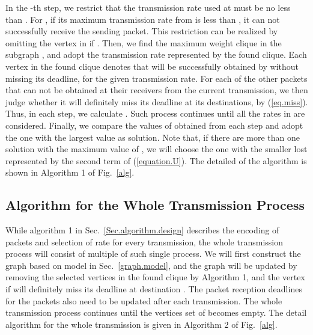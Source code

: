 \documentclass[journal]{IEEEtran}
\begin{document}
In the -th step, we restrict that the transmission rate used at  must be no less than . For , if its maximum transmission rate from  is less than , it can not successfully receive the sending packet. This restriction can be realized by omitting the vertex  in  if . Then, we find the maximum weight clique in the subgraph , and adopt the transmission rate represented by the found clique. Each vertex  in the found clique denotes that  will be successfully obtained by  without missing its deadline, for the given transmission rate. For each of the other packets that can not be obtained at their receivers from the current transmission, we then judge whether it will definitely miss its deadline at its destinations, by (\ref{eq.miss}). Thus, in each step, we calculate . Such process continues until all the rates in  are considered. Finally, we compare the values of  obtained from each step and adopt the one with the largest value as solution.
Note that, if there are more than one solution with the maximum value of , we will choose the one with the smaller lost represented by the second term of (\ref{equation.U}).
The detailed of the algorithm is shown in Algorithm 1 of Fig.~\ref{alg}.
\vspace{-0.1in}
\subsection{Algorithm for the Whole Transmission Process}\vspace{-0.02in}
While algorithm 1 in Sec.~\ref{Sec.algorithm.design} describes the encoding of packets and selection of rate for every transmission, the whole transmission process will consist of multiple of such single process. We will first construct the graph  based on model in Sec.~\ref{graph.model}, and the graph will be updated by removing the selected vertices in the found clique by Algorithm 1, and the vertex  if  will definitely miss its deadline at destination . The packet reception deadlines for the packets also need to be updated after each transmission. The whole transmission process continues until the vertices set  of  becomes empty. The detail algorithm for the whole transmission is given in Algorithm 2 of Fig.~\ref{alg}.
\end{document}
